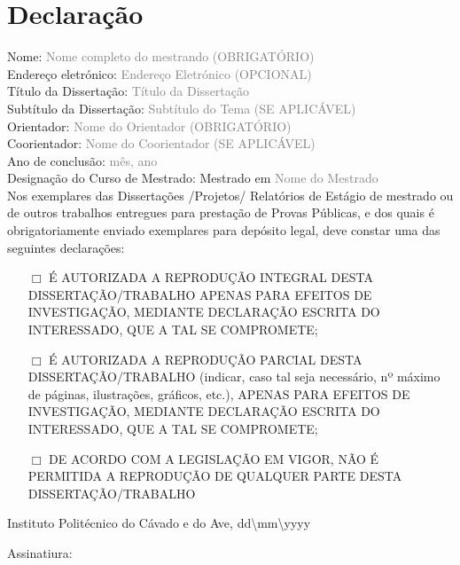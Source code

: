 \chapter{Declaração}


Nome: 											\textcolor{gray}{Nome completo do mestrando (OBRIGATÓRIO)}\\
Endereço eletrónico: 							\textcolor{gray}{Endereço Eletrónico (OPCIONAL)}\\
Título da Dissertação: 							\textcolor{gray}{Título da Dissertação}\\
Subtítulo da Dissertação: 						\textcolor{gray}{Subtítulo do Tema (SE APLICÁVEL)}\\
Orientador: 									\textcolor{gray}{Nome do Orientador (OBRIGATÓRIO)}\\
Coorientador:									\textcolor{gray}{Nome do Coorientador (SE APLICÁVEL)}\\
Ano de conclusão: 								\textcolor{gray}{mês, ano}\\
Designação do Curso de Mestrado: Mestrado em 	\textcolor{gray}{Nome do Mestrado}\\

\noindent
Nos exemplares das Dissertações /Projetos/ Relatórios de Estágio de mestrado ou de outros trabalhos entregues para prestação de Provas Públicas, e dos quais é obrigatoriamente enviado exemplares para depósito legal, deve constar uma das seguintes declarações:

{
\begin{itemize}[align=parleft]%
\item [$\Box$]\hspace{6mm} É AUTORIZADA A REPRODUÇÃO INTEGRAL DESTA DISSERTAÇÃO/TRABALHO APENAS PARA EFEITOS DE INVESTIGAÇÃO, MEDIANTE DECLARAÇÃO ESCRITA DO INTERESSADO, QUE A TAL SE COMPROMETE;

\item [$\Box$]\hspace{6mm} É AUTORIZADA A REPRODUÇÃO PARCIAL DESTA DISSERTAÇÃO/TRABALHO (indicar, caso tal seja necessário, nº máximo de páginas, ilustrações, gráficos, etc.), APENAS PARA EFEITOS DE INVESTIGAÇÃO, MEDIANTE DECLARAÇÃO ESCRITA DO INTERESSADO, QUE A TAL SE COMPROMETE;

\item [$\Box$]\hspace{6mm} DE ACORDO COM A LEGISLAÇÃO EM VIGOR, NÃO É PERMITIDA A REPRODUÇÃO DE QUALQUER PARTE DESTA DISSERTAÇÃO/TRABALHO

\end{itemize}
}
\vspace{0.2cm}

\noindent
Instituto Politécnico do Cávado e do Ave, dd\textbackslash mm\textbackslash yyyy 

\vspace{0.5cm}
\noindent
Assinatiura: \underline{\hspace{9cm}}

